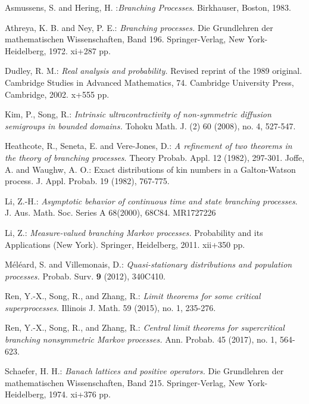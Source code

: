 \documentclass[12pt,a4paper]{amsart}
\numberwithin{equation}{section}
\theoremstyle{plain}
\theoremstyle{definition}
\theoremstyle{remark}
\begin{document}
\begin{thebibliography}{99}

Asmussens, S. and Hering, H. :\emph{Branching Processes}. Birkhauser, Boston, 1983.

Athreya, K. B. and Ney, P. E.:
\emph{Branching processes.}
Die Grundlehren der mathematischen Wissenschaften, Band 196. Springer-Verlag, New York-Heidelberg, 1972. xi+287 pp.

Dudley, R. M.:
\emph{Real analysis and probability.}
Revised reprint of the 1989 original. Cambridge Studies in Advanced Mathematics, 74. Cambridge University Press, Cambridge, 2002. x+555 pp.

Kim, P., Song, R.:
\emph{Intrinsic ultracontractivity of non-symmetric diffusion semigroups in bounded domains.}
Tohoku Math. J. (2) 60 (2008), no. 4, 527-547.


Heathcote, R.,  Seneta, E.  and Vere-Jones, D.:  \emph{ A refinement of two theorems in the
theory of branching processes}. Theory Probab. Appl. 12 (1982), 297-301.
Joffe, A. and Waughw, A. O.:  Exact distributions of kin numbers in a Galton-Watson
process. J. Appl. Probab. 19 (1982), 767-775.

 Li, Z.-H.:
\emph{Asymptotic behavior of continuous time and state branching processes}. J. Aus. Math. Soc.
Series A 68(2000), 68C84. MR1727226

Li, Z.:
\emph{Measure-valued branching Markov processes.}
Probability and its Applications (New York). Springer, Heidelberg, 2011. xii+350 pp.

M\'el\'eard, S. and Villemonais, D.:
\emph{Quasi-stationary distributions and population processes.}
Probab. Surv. \textbf{9} (2012), 340C410.

Ren, Y.-X., Song, R., and Zhang, R.:
\emph{Limit theorems for some critical superprocesses.}
Illinois J. Math. 59 (2015), no. 1, 235-276.

Ren, Y.-X., Song, R., and Zhang, R.:
\emph{Central limit theorems for supercritical branching nonsymmetric Markov processes.}
Ann. Probab. 45 (2017), no. 1, 564-623.

Schaefer, H. H.:
\emph{Banach lattices and positive operators.}
Die Grundlehren der mathematischen Wissenschaften, Band 215. Springer-Verlag, New York-Heidelberg, 1974. xi+376 pp.



\end{thebibliography}
\end{document}
